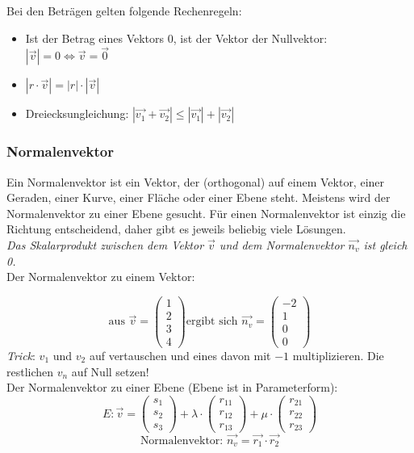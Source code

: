 Bei den Beträgen gelten folgende Rechenregeln:
\begin{itemize}
  \item Ist der Betrag eines Vektors $0$, ist der Vektor der Nullvektor:
    $|\vec{v}| = 0 \Leftrightarrow \vec{v} = \vec{0}$
  \item $|r \cdot \vec{v}| = |r| \cdot |\vec{v}|$
  \item Dreiecksungleichung: $|\vec{v_1} + \vec{v_2}| \le 
    |\vec{v_1}| + |\vec{v_2}|$
\end{itemize}

\subsubsection{Normalenvektor}
Ein Normalenvektor ist ein Vektor, der  (orthogonal) auf einem Vektor, einer Geraden, einer Kurve, einer Fläche oder einer Ebene steht. Meistens wird der Normalenvektor zu einer Ebene gesucht. Für einen Normalenvektor ist einzig die Richtung entscheidend, daher gibt es jeweils beliebig viele Lösungen. 
\\\emph{Das Skalarprodukt zwischen dem Vektor $\vec{v}$ und dem Normalenvektor $\vec{n_v}$ ist gleich 0.}
\\Der Normalenvektor zu einem Vektor:

\[ \text{aus } \vec{v} = \begin{pmatrix} 1 \\ 2 \\ 3 \\ 4 \end{pmatrix} \text{ergibt sich } \vec{n_v} = \begin{pmatrix} -2 \\ 1 \\ 0 \\ 0 \end{pmatrix} \]
\emph{Trick}: $v_1$ und $v_2$ auf vertauschen und eines davon mit $-1$
multiplizieren. Die restlichen $v_n$ auf Null setzen!
\\Der Normalenvektor zu einer Ebene (Ebene ist in Parameterform):
\[ E: \vec{v} = \begin{pmatrix} s_1 \\ s_2 \\ s_3 \end{pmatrix} + \lambda \cdot \begin{pmatrix} r_{11} \\ r_{12} \\ r_{13} \end{pmatrix} + \mu \cdot \begin{pmatrix} r_{21} \\ r_{22} \\ r_{23} \end{pmatrix} \]
\[ \text{Normalenvektor: } \vec{n_v} = \vec{r_1} \cdot \vec{r_2} \]

